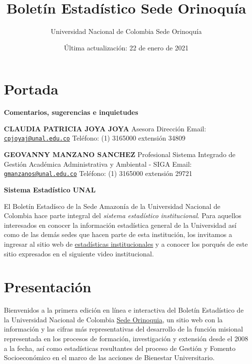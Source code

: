 \documentclass[
]{book}
\title{Boletín Estadístico Sede Orinoquía}
\author{ Universidad Nacional de Colombia Sede Orinoquía}
\date{Última actualización: 22 de enero de 2021}
\begin{document}
\maketitle

{
\setcounter{tocdepth}{1}
\tableofcontents
}
\hypertarget{portada}{%
\chapter*{Portada}\label{portada}}

\textbf{Comentarios, sugerencias e inquietudes}

\textbf{CLAUDIA PATRICIA JOYA JOYA}
Asesora Dirección
Email: \href{mailto:cpjoyaj@unal.edu.co}{\nolinkurl{cpjoyaj@unal.edu.co}}
Teléfono: (1) 3165000 extensión 34809

\textbf{GEOVANNY MANZANO SANCHEZ}
Profesional Sistema Integrado de Gestión Académica Administrativa y Ambiental - SIGA
Email: \href{mailto:gmanzanos@unal.edu.co}{\nolinkurl{gmanzanos@unal.edu.co}}
Teléfono: (1) 3165000 extensión 29721

\textbf{Sistema Estadístico UNAL}

El Boletín Estadísco de la Sede Amazonía de la Universidad Nacional de Colombia hace parte integral del \emph{sistema estadístico institucional}. Para aquellos interesados en conocer la información estadística general de la Universidad así como de las demás sedes que hacen parte de esta institución, los invitamos a ingresar al sitio web de \href{http://estadisticas.unal.edu.co/home/}{estadísticas institucionales} y a conocer los porqués de este sitio expresados en el siguiente video institucional.

\hypertarget{Presenta}{%
\chapter*{Presentación}\label{Presenta}}

Bienvenidos a la primera edición en línea e interactiva del Boletín Estadístico de la Universidad Nacional de Colombia \href{http://orinoquia.unal.edu.co/}{Sede Orinoquia}, un sitio web con la información y las cifras más representativas del desarrollo de la función misional representada en los procesos de formación, investigación y extensión desde el 2008 a la fecha, así como estadísticas resultantes del proceso de Gestión y Fomento Socioeconómico en el marco de las acciones de Bienestar Universitario.
\end{document}
